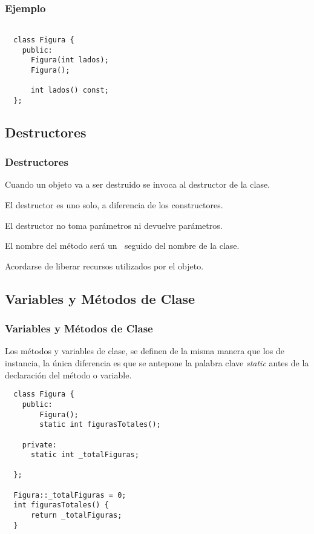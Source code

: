 \documentclass{beamer}
\begin{document}
\begin{frame}[fragile]
\frametitle{Ejemplo}
\begin{verbatim}
 
  class Figura {
    public:
      Figura(int lados);
      Figura();

      int lados() const;
  };
\end{verbatim}

\end{frame}

%
%

\subsection{Destructores}
\begin{frame}
\frametitle{Destructores}

Cuando un objeto va a ser destruido se invoca al destructor de la clase.

El destructor es uno solo, a diferencia de los constructores. 

El destructor no toma parámetros ni devuelve parámetros.

El nombre del método será un $~$ seguido del nombre de la clase.

\begin{block}
Acordarse de liberar recursos utilizados por el objeto.
\end{block}

\end{frame}

\subsection{Variables y Métodos de Clase}
\begin{frame}[fragile]
\frametitle{Variables y Métodos de Clase}
   Los métodos y variables de clase, se definen de la misma manera que los de instancia, la única diferencia
   es que se antepone la palabra clave \emph{static} antes de la declaración del método o variable. \\
\end{frame}

\begin{frame}[fragile]
\begin{verbatim}
  class Figura {
    public:
        Figura();
        static int figurasTotales();

    private:
      static int _totalFiguras;

  };

  Figura::_totalFiguras = 0;
  int figurasTotales() {
      return _totalFiguras;
  }
\end{verbatim}

\end{frame}
\end{document}
